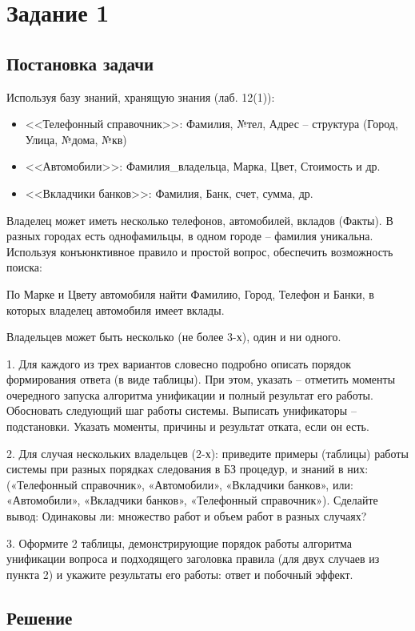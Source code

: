 \section*{Задание 1}
\subsection*{Постановка задачи}
Используя базу знаний, хранящую знания (лаб. 12(1)):
\begin{itemize}
	\item <<Телефонный справочник>>: Фамилия, №тел, Адрес – структура (Город, Улица, №дома, №кв)
	\item <<Автомобили>>: Фамилия\_владельца, Марка, Цвет, Стоимость и др.
	\item <<Вкладчики банков>>: Фамилия, Банк, счет, сумма, др.
\end{itemize}


Владелец может иметь несколько телефонов, автомобилей, вкладов (Факты).
В разных городах есть однофамильцы, в одном городе – фамилия уникальна.
Используя конъюнктивное правило и простой вопрос, обеспечить возможность
поиска:

По Марке и Цвету автомобиля найти Фамилию, Город, Телефон и Банки, в которых
владелец автомобиля имеет вклады.

Владельцев может быть несколько (не более 3-х), один и ни одного.  

1. Для каждого из трех вариантов словесно подробно описать порядок
формирования ответа (в виде таблицы). При этом, указать – отметить моменты
очередного запуска алгоритма унификации и полный результат его работы.
Обосновать следующий шаг работы системы. Выписать унификаторы –
подстановки. Указать моменты, причины и результат отката, если он есть.

2. Для случая нескольких владельцев (2-х):
приведите примеры (таблицы) работы системы при разных порядках
следования в БЗ процедур, и знаний в них: («Телефонный справочник»,
«Автомобили», «Вкладчики банков», или: «Автомобили», «Вкладчики
банков», «Телефонный справочник»). Сделайте вывод: Одинаковы ли:
множество работ и объем работ в разных случаях?

3. Оформите 2 таблицы, демонстрирующие порядок работы алгоритма
унификации вопроса и подходящего заголовка правила (для двух случаев из
пункта 2) и укажите результаты его работы: ответ и побочный эффект.


\clearpage
\subsection*{Решение}


